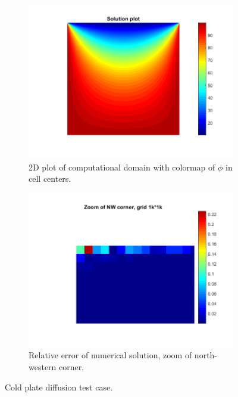 \documentclass[]{article}
\begin{document}
\begin{figure}
	\centering
	\begin{subfigure}{.49\textwidth}
		\centering
		\includegraphics[width=1\linewidth]{figs/diffusion_hot_plate_simulation_1k}
		\caption{2D plot of computational domain with colormap of $ \phi $ in cell centers.}
		\label{fig:diffusionhotplatesimulation1k}
	\end{subfigure}
	\begin{subfigure}{.49\textwidth}
		\centering
		\includegraphics[width=1\linewidth]{figs/diffusion_hot_plate_error_corner_1k}
		\caption{Relative error of numerical solution, zoom of north-western corner.}
		\label{fig:diffusionhotplateerrorcorner1k}
	\end{subfigure}
	\caption{Cold plate diffusion test case.}
	\label{fig:diffusion_hot_plate}
\end{figure}
\end{document}
